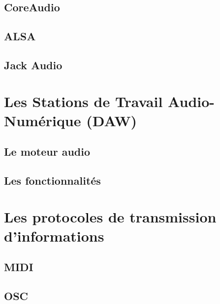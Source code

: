 \documentclass[
  letterpaper,
  DIV=11,
  numbers=noendperiod]{scrreprt}
\begin{document}
\hypertarget{coreaudio}{%
\subsection{CoreAudio}\label{coreaudio}}

\hypertarget{alsa}{%
\subsection{ALSA}\label{alsa}}

\hypertarget{jack-audio}{%
\subsection{Jack Audio}\label{jack-audio}}

\hypertarget{les-stations-de-travail-audio-numuxe9rique-daw}{%
\section{Les Stations de Travail Audio-Numérique
(DAW)}\label{les-stations-de-travail-audio-numuxe9rique-daw}}

\hypertarget{le-moteur-audio}{%
\subsection{Le moteur audio}\label{le-moteur-audio}}

\hypertarget{les-fonctionnalituxe9s}{%
\subsection{Les fonctionnalités}\label{les-fonctionnalituxe9s}}

\hypertarget{les-protocoles-de-transmission-dinformations}{%
\section{Les protocoles de transmission
d'informations}\label{les-protocoles-de-transmission-dinformations}}

\hypertarget{midi}{%
\subsection{MIDI}\label{midi}}

\hypertarget{osc}{%
\subsection{OSC}\label{osc}}
\end{document}
